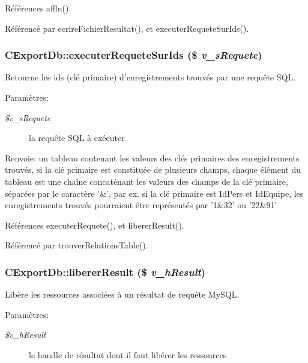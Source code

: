 Références affln().

Référencé par ecrireFichierResultat(), et executerRequeteSurIds().
\subsubsection{\setlength{\rightskip}{0pt plus 5cm}CExportDb::executerRequeteSurIds (\$ {\em v\_\-sRequete})}\label{class_c_export_db_32a9894900288704394b454c54f25af8}


Retourne les ids (clé primaire) d'enregistrements trouvés par une requête SQL. 

\begin{Desc}
\item[Paramètres:]
\begin{description}
\item[{\em \$v\_\-sRequete}]la requête SQL à exécuter\end{description}
\end{Desc}
\begin{Desc}
\item[Renvoie:]un tableau contenant les valeurs des clés primaires des enregistrements trouvés, si la clé primaire est constituée de plusieurs champs, chaque élément du tableau est une chaîne concaténant les valeurs des champs de la clé primaire, séparées par le caractère '\&', par ex. si la clé primaire est IdPers et IdEquipe, les enregistrements trouvés pourraient être représentés par '1\&32' ou '22\&91' \end{Desc}


Références executerRequete(), et libererResult().

Référencé par trouverRelationsTable().
\subsubsection{\setlength{\rightskip}{0pt plus 5cm}CExportDb::libererResult (\$ {\em v\_\-hResult})}\label{class_c_export_db_a1a5e57f5d8e5b66e06cbc0be7751005}


Libère les ressources associées à un résultat de requête MySQL. 

\begin{Desc}
\item[Paramètres:]
\begin{description}
\item[{\em \$v\_\-hResult}]le handle de résultat dont il faut libérer les ressources \end{description}
\end{Desc}


